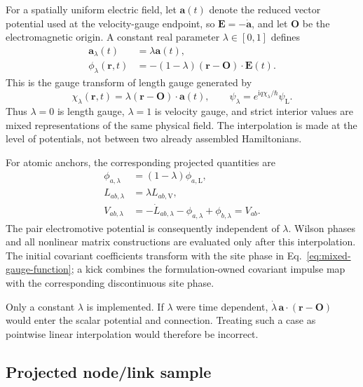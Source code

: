 \documentclass[11pt]{article}
\newcommand{\ii}{\mathrm{i}}
\newcommand{\vect}[1]{\bm{#1}}
\begin{document}
For a spatially uniform electric field, let \(\vect a(t)\) denote the reduced
vector potential used at the velocity-gauge endpoint, so
\(\vect E=-\dot{\vect a}\), and let \(\vect O\) be the electromagnetic
origin. A constant real parameter \(\lambda\in[0,1]\) defines
\begin{align}
 \vect a_\lambda(t)&=\lambda\vect a(t),\label{eq:mixed-vector-potential}\\
 \phi_\lambda(\vect r,t)
   &=-(1-\lambda)(\vect r-\vect O)\cdot\vect E(t).
   \label{eq:mixed-scalar-potential}
\end{align}
This is the gauge transform of length gauge generated by
\begin{equation}
 \chi_\lambda(\vect r,t)
   =\lambda(\vect r-\vect O)\cdot\vect a(t),
 \qquad
 \psi_\lambda=e^{\ii q\chi_\lambda/\hbar}\psi_{\mathrm L}.
 \label{eq:mixed-gauge-function}
\end{equation}
Thus \(\lambda=0\) is length gauge, \(\lambda=1\) is velocity gauge, and
strict interior values are mixed representations of the same physical field.
The interpolation is made at the level of potentials, not between two
already assembled Hamiltonians.

For atomic anchors, the corresponding projected quantities are
\begin{align}
 \phi_{a,\lambda}&=(1-\lambda)\phi_{a,\mathrm L},\\
 L_{ab,\lambda}&=\lambda L_{ab,\mathrm V},\\
 V_{ab,\lambda}
 &=-\dot L_{ab,\lambda}-\phi_{a,\lambda}+\phi_{b,\lambda}
 =V_{ab}.
 \label{eq:mixed-projected-source}
\end{align}
The pair electromotive potential is consequently independent of \(\lambda\).
Wilson phases and all nonlinear matrix constructions are evaluated only after
this interpolation. The initial covariant coefficients transform with the
site phase in Eq.~\eqref{eq:mixed-gauge-function}; a kick combines the
formulation-owned covariant impulse map with the corresponding discontinuous
site phase.

Only a constant \(\lambda\) is implemented. If \(\lambda\) were time
dependent, \(\dot\lambda\,\vect a\cdot(\vect r-\vect O)\) would enter the
scalar potential and connection. Treating such a case as pointwise linear
interpolation would therefore be incorrect.

\subsection{Projected node/link sample}
\end{document}
